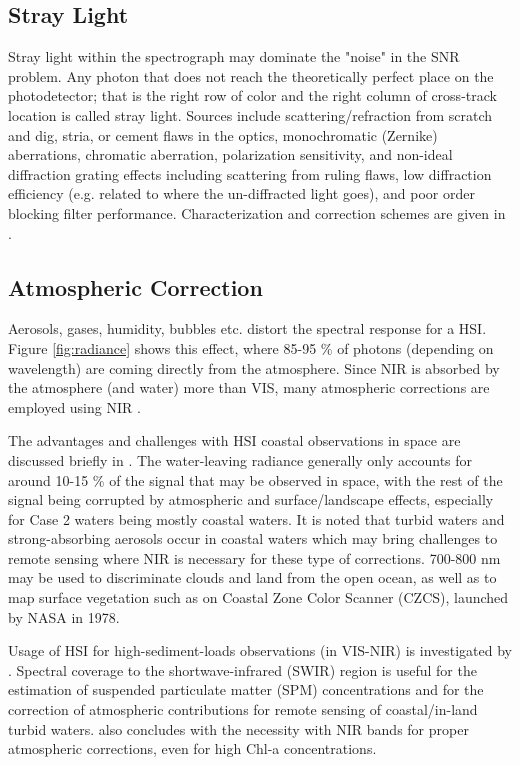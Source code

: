 \subsection{Stray Light}
Stray light within the spectrograph may dominate the "noise" in the SNR problem. Any photon that does not reach the theoretically perfect place on the photodetector; that is the right row of color and the right column of cross-track location is called stray light. Sources include scattering/refraction from scratch and dig, stria, or cement flaws in the optics, monochromatic (Zernike) aberrations, chromatic aberration, polarization sensitivity, and non-ideal diffraction grating effects including scattering from ruling flaws, low diffraction efficiency (e.g. related to where the un-diffracted light goes), and poor order blocking filter performance. Characterization and correction schemes are given in \cite{Zonga2007}.

\subsection{Atmospheric Correction}
Aerosols, gases, humidity, bubbles etc. distort the spectral response for a HSI. Figure \ref{fig:radiance} shows this effect, where 85-95 $\%$ of photons (depending on wavelength) are coming directly from the atmosphere. Since NIR is absorbed by the atmosphere (and water) more than VIS, many atmospheric corrections are employed using NIR \cite{Corson2011, Patissier2014}.

The advantages and challenges with HSI coastal observations in space are discussed briefly in \cite{Emberton2016}. The water-leaving radiance generally only accounts for around 10-15 \% of the signal that may be observed in space, with the rest of the signal being corrupted by atmospheric and surface/landscape effects, especially for Case 2 waters being mostly coastal waters. It is noted that turbid waters and strong-absorbing aerosols occur in coastal waters which may bring challenges to remote sensing where NIR is necessary for these type of corrections. 700-800 nm may be used to discriminate clouds and land from the open ocean, as well as to map surface vegetation \cite{Emberton2016} such as on Coastal Zone Color Scanner (CZCS), launched by NASA in 1978.

Usage of HSI for high-sediment-loads observations (in VIS-NIR) is investigated by \cite{Lee2016}. Spectral coverage to the shortwave-infrared (SWIR) region is useful for the estimation of suspended particulate matter (SPM) concentrations and for the correction of atmospheric contributions for remote sensing of coastal/in-land turbid waters. \cite{Siegel2000} also concludes with the necessity with NIR bands for proper atmospheric corrections, even for high Chl-a concentrations.

